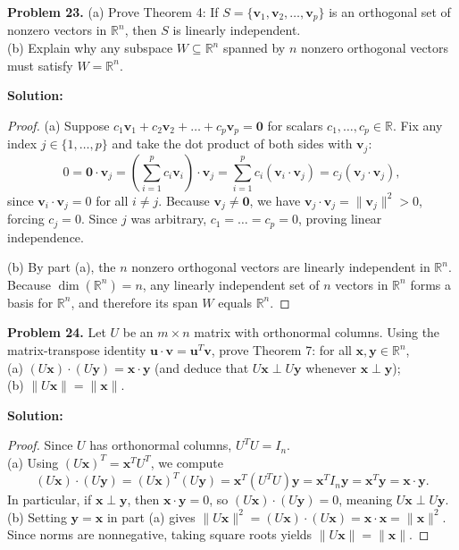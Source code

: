 \documentclass[11pt, letterpaper]{article}
\theoremstyle{definition}
\theoremstyle{remark}
\begin{document}
\textbf{Problem 23.} (a) Prove Theorem 4: If $S = \{\mathbf{v}_1, \mathbf{v}_2, \dots, \mathbf{v}_p\}$ is an orthogonal set of nonzero vectors in $\mathbb{R}^n$, then $S$ is linearly independent. \\
(b) Explain why any subspace $W \subseteq \mathbb{R}^n$ spanned by $n$ nonzero orthogonal vectors must satisfy $W = \mathbb{R}^n$.

\textbf{Solution:}
\begin{proof}
(a) Suppose $c_1\mathbf{v}_1 + c_2\mathbf{v}_2 + \dots + c_p\mathbf{v}_p = \mathbf{0}$ for scalars $c_1, \dots, c_p \in \mathbb{R}$. Fix any index $j \in \{1, \dots, p\}$ and take the dot product of both sides with $\mathbf{v}_j$:
\[
0 = \mathbf{0} \cdot \mathbf{v}_j = \left(\sum_{i=1}^p c_i \mathbf{v}_i\right) \cdot \mathbf{v}_j = \sum_{i=1}^p c_i (\mathbf{v}_i \cdot \mathbf{v}_j) = c_j(\mathbf{v}_j \cdot \mathbf{v}_j),
\]
since $\mathbf{v}_i \cdot \mathbf{v}_j = 0$ for all $i \neq j$. Because $\mathbf{v}_j \neq \mathbf{0}$, we have $\mathbf{v}_j \cdot \mathbf{v}_j = \|\mathbf{v}_j\|^2 > 0$, forcing $c_j = 0$. Since $j$ was arbitrary, $c_1 = \dots = c_p = 0$, proving linear independence.

(b) By part (a), the $n$ nonzero orthogonal vectors are linearly independent in $\mathbb{R}^n$. Because $\operatorname{dim}(\mathbb{R}^n) = n$, any linearly independent set of $n$ vectors in $\mathbb{R}^n$ forms a basis for $\mathbb{R}^n$, and therefore its span $W$ equals $\mathbb{R}^n$.
\end{proof}

\textbf{Problem 24.} Let $U$ be an $m \times n$ matrix with orthonormal columns. Using the matrix-transpose identity $\mathbf{u} \cdot \mathbf{v} = \mathbf{u}^T \mathbf{v}$, prove Theorem 7: for all $\mathbf{x}, \mathbf{y} \in \mathbb{R}^n$, \\
(a) $(U\mathbf{x}) \cdot (U\mathbf{y}) = \mathbf{x} \cdot \mathbf{y}$ (and deduce that $U\mathbf{x} \perp U\mathbf{y}$ whenever $\mathbf{x} \perp \mathbf{y}$); \\
(b) $\|U\mathbf{x}\| = \|\mathbf{x}\|$.

\textbf{Solution:}
\begin{proof}
Since $U$ has orthonormal columns, $U^T U = I_n$. \\
(a) Using $(U\mathbf{x})^T = \mathbf{x}^T U^T$, we compute
\[
(U\mathbf{x}) \cdot (U\mathbf{y}) = (U\mathbf{x})^T(U\mathbf{y}) = \mathbf{x}^T (U^T U) \mathbf{y} = \mathbf{x}^T I_n \mathbf{y} = \mathbf{x}^T \mathbf{y} = \mathbf{x} \cdot \mathbf{y}.
\]
In particular, if $\mathbf{x} \perp \mathbf{y}$, then $\mathbf{x} \cdot \mathbf{y} = 0$, so $(U\mathbf{x}) \cdot (U\mathbf{y}) = 0$, meaning $U\mathbf{x} \perp U\mathbf{y}$. \\
(b) Setting $\mathbf{y} = \mathbf{x}$ in part (a) gives $\|U\mathbf{x}\|^2 = (U\mathbf{x}) \cdot (U\mathbf{x}) = \mathbf{x} \cdot \mathbf{x} = \|\mathbf{x}\|^2$. Since norms are nonnegative, taking square roots yields $\|U\mathbf{x}\| = \|\mathbf{x}\|$.
\end{proof}
\end{document}
